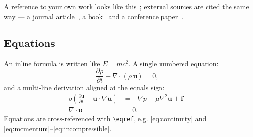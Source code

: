 %
%
\chapter{}
\label{ch:example}

 A reference to your own work
looks like this~\autocite{Panov2025}; external sources are cited the same way ---
a journal article~\autocite{example-article}, a book~\autocite{example-book} and a
conference paper~\autocite{example-conf}.

\section{Equations}
\label{sec:example-equations}

An inline formula is written like $E = mc^2$. A single numbered equation:
\begin{equation}
  \label{eq:continuity}
  \frac{\partial \rho}{\partial t} + \nabla \cdot (\rho\, \mathbf{u}) = 0 ,
\end{equation}
and a multi-line derivation aligned at the equals sign:
\begin{align}
  \rho \left( \frac{\partial \mathbf{u}}{\partial t}
    + \mathbf{u} \cdot \nabla \mathbf{u} \right)
  &= -\nabla p + \mu \nabla^2 \mathbf{u} + \mathbf{f}, \label{eq:momentum}\\
  \nabla \cdot \mathbf{u} &= 0 . \label{eq:incompressible}
\end{align}
Equations are cross-referenced with \verb!\eqref!, e.g.
\eqref{eq:continuity} and \eqref{eq:momentum}--\eqref{eq:incompressible}.

